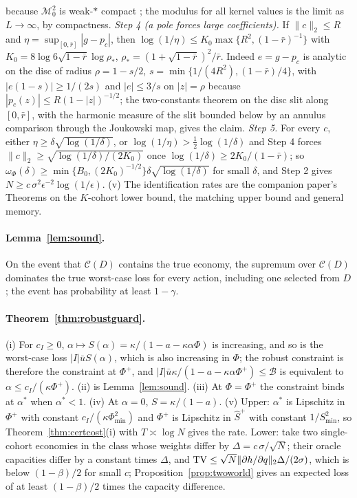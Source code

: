 \documentclass[12pt]{article}
\theoremstyle{definition}
\theoremstyle{remark}
\begin{document}
because $\mathcal M_0^2$ is weak-$*$ compact \citep{donoho1994}; the modulus for all kernel values is the limit as $L\to\infty$, by compactness. \emph{Step 4 (a pole forces large coefficients).} If $\|c\|_2\le R$ and $\eta=\sup_{[0,\bar r]}|g-p_c|$, then $\log(1/\eta)\le K_0\max\{R^2,(1-\bar r)^{-1}\}$ with $K_0=8\log6\sqrt{1-\bar r}\log\rho_*$, $\rho_*=(1+\sqrt{1-\bar r})^2/\bar r$. Indeed $e=g-p_c$ is analytic on the disc of radius $\rho=1-s/2$, $s=\min\{1/(4R^2),(1-\bar r)/4\}$, with $|e(1-s)|\ge1/(2s)$ and $|e|\le3/s$ on $|z|=\rho$ because $|p_c(z)|\le R(1-|z|)^{-1/2}$; the two-constants theorem on the disc slit along $[0,\bar r]$, with the harmonic measure of the slit bounded below by an annulus comparison through the Joukowski map, gives the claim. \emph{Step 5.} For every $c$, either $\eta\ge\delta\sqrt{\log(1/\delta)}$, or $\log(1/\eta)>\tfrac12\log(1/\delta)$ and Step 4 forces $\|c\|_2\ge\sqrt{\log(1/\delta)/(2K_0)}$ once $\log(1/\delta)\ge2K_0/(1-\bar r)$; so $\omega_\Phi(\delta)\ge\min\{B_0,(2K_0)^{-1/2}\}\delta\sqrt{\log(1/\delta)}$ for small $\delta$, and Step 2 gives $N\ge c\,\sigma^2\epsilon^{-2}\log(1/\epsilon)$. (v) The identification rates are the companion paper's Theorems on the $K$-cohort lower bound, the matching upper bound and general memory.

\paragraph{Lemma~\ref{lem:sound}.} On the event that $\mathcal C(D)$ contains the true economy, the supremum over $\mathcal C(D)$ dominates the true worst-case loss for every action, including one selected from $D$; the event has probability at least $1-\gamma$.

\paragraph{Theorem~\ref{thm:robustguard}.} (i) For $c_I\ge0$, $\alpha\mapsto S(\alpha)=\kappa/(1-a-\kappa\alpha\Phi)$ is increasing, and so is the worst-case loss $|I|\bar uS(\alpha)$, which is also increasing in $\Phi$; the robust constraint is therefore the constraint at $\Phi^+$, and $|I|\bar u\kappa/(1-a-\kappa\alpha\Phi^+)\le\mathcal B$ is equivalent to $\alpha\le c_I/(\kappa\Phi^+)$. (ii) is Lemma~\ref{lem:sound}. (iii) At $\Phi=\Phi^+$ the constraint binds at $\alpha^*$ when $\alpha^*<1$. (iv) At $\alpha=0$, $S=\kappa/(1-a)$. (v) Upper: $\alpha^*$ is Lipschitz in $\Phi^+$ with constant $c_I/(\kappa\Phi_{\min}^2)$ and $\Phi^+$ is Lipschitz in $\hat S^+$ with constant $1/S_{\min}^2$, so Theorem~\ref{thm:certcost}(i) with $T\asymp\log N$ gives the rate. Lower: take two single-cohort economies in the class whose weights differ by $\Delta=c\,\sigma/\sqrt N$; their oracle capacities differ by a constant times $\Delta$, and ${\rm TV}\le\sqrt N\|\partial h/\partial q\|_2\Delta/(2\sigma)$, which is below $(1-\beta)/2$ for small $c$; Proposition~\ref{prop:twoworld} gives an expected loss of at least $(1-\beta)/2$ times the capacity difference.
\end{document}
